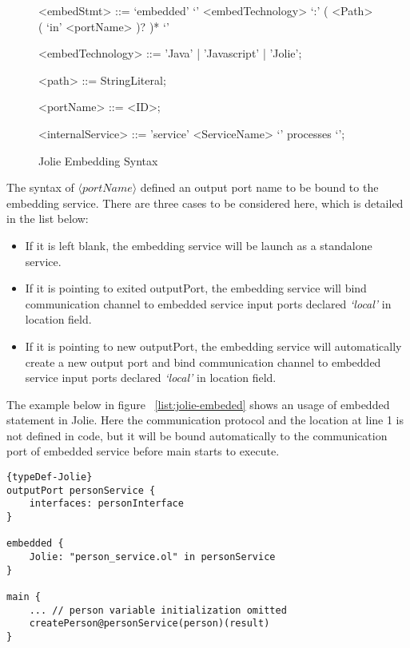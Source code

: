 \begin{figure}[ht]
    \begin{framed}
        \begin{grammar}
            <embedStmt> ::= `embedded' `{' <embedTechnology> `:' ( <Path> ( `in' <portName> )? )* `}'

            <embedTechnology> ::= 'Java' | 'Javascript' | 'Jolie';

            <path> ::= StringLiteral;

            <portName> ::= <ID>;

            <internalService>
            ::= 'service' <ServiceName> `{' processes `}';
        \end{grammar}
    \end{framed}
    \caption{Jolie Embedding Syntax}
    \label{fig:embedded-syntax}
\end{figure}

The syntax of \(\langle portName \rangle\) defined an output port name to be bound to the embedding service. There are three cases to be considered here, which is detailed in the list below:

\begin{itemize}
    \item If it is left blank, the embedding service will be launch as a standalone service.
    \item If it is pointing to exited outputPort, the embedding service will bind communication channel to embedded service input ports declared \textit{`local'} in location field.
    \item If it is pointing to new outputPort, the embedding service will automatically create a new output port and bind communication channel to embedded service input ports declared \textit{`local'} in location field.
\end{itemize}

The example below in figure ~\ref{list:jolie-embeded} shows an usage of embedded statement in Jolie. Here the communication protocol and the location at line 1 is not defined in code, but it will be bound automatically to the communication port of embedded service before main starts to execute. 

\begin{listing}[ht]

\lstset{language=Jolie,
    style=codeStyle,
    numbers=left,
    firstnumber=1
}
\begin{lstlisting}[frame=tlrb, caption= {Jolie Embedding example}, label={list:jolie-embeded} ]{typeDef-Jolie}
outputPort personService {
    interfaces: personInterface
}

embedded {
    Jolie: "person_service.ol" in personService
}

main {
    ... // person variable initialization omitted
    createPerson@personService(person)(result)
}
\end{lstlisting}
\end{listing}

\FloatBarrier
